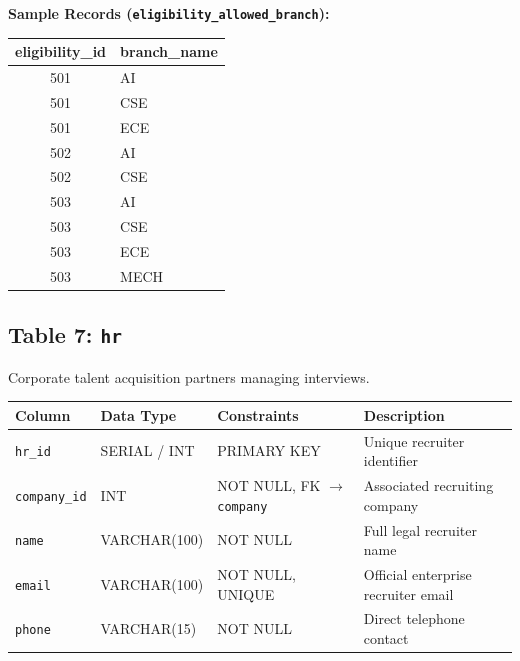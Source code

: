 \documentclass[11pt,a4paper]{article}
\begin{document}
\textbf{Sample Records (\texttt{eligibility\_allowed\_branch}):}
\begin{table}[H]
    \centering
    \scriptsize
    \begin{tabular}{c l}
        \toprule
        \textbf{eligibility\_id} & \textbf{branch\_name} \\
        \midrule
        501 & AI \\
        501 & CSE \\
        501 & ECE \\
        502 & AI \\
        502 & CSE \\
        503 & AI \\
        503 & CSE \\
        503 & ECE \\
        503 & MECH \\
        \bottomrule
    \end{tabular}
\end{table}

\subsection{Table 7: \texttt{hr}}
Corporate talent acquisition partners managing interviews.

\begin{table}[H]
    \centering
    \footnotesize
    \begin{tabularx}{\textwidth}{l l l X}
        \toprule
        \textbf{Column} & \textbf{Data Type} & \textbf{Constraints} & \textbf{Description} \\
        \midrule
        \texttt{hr\_id} & SERIAL / INT & PRIMARY KEY & Unique recruiter identifier \\
        \texttt{company\_id} & INT & NOT NULL, FK \(\to\) \texttt{company} & Associated recruiting company \\
        \texttt{name} & VARCHAR(100) & NOT NULL & Full legal recruiter name \\
        \texttt{email} & VARCHAR(100) & NOT NULL, UNIQUE & Official enterprise recruiter email \\
        \texttt{phone} & VARCHAR(15) & NOT NULL & Direct telephone contact \\
        \bottomrule
    \end{tabularx}
\end{table}
\end{document}
